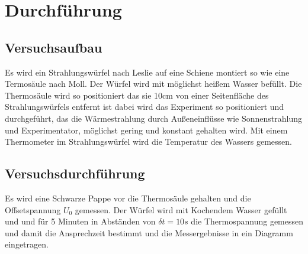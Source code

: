 \section{Durchführung}
\label{sec:Durchführung}
\subsection{Versuchsaufbau}
Es wird ein Strahlungswürfel nach Leslie auf eine Schiene montiert so wie eine
Termosäule nach Moll. Der Würfel wird mit möglichst heißem Wasser befüllt. Die
Thermosäule wird so positioniert das sie 10cm von einer Seitenfläche des
Strahlungswürfels entfernt ist dabei wird das Experiment so positioniert und
durchgeführt, das die Wärmestrahlung durch Außeneinflüsse wie Sonnenstrahlung
und Experimentator, möglichst gering und konstant gehalten  wird. Mit einem
Thermometer im Strahlungswürfel wird die Temperatur des Wassers gemessen.

\subsection{Versuchsdurchführung}
Es wird eine Schwarze Pappe vor die Thermosäule gehalten und die Offsetspannung
$U_0$ gemessen.
Der Würfel wird mit Kochendem Wasser gefüllt und und für 5 Minuten in Abständen
von $\delta t =10s$ die Thermospannung gemessen und damit die Ansprechzeit
bestimmt und die Messergebnisse in ein Diagramm eingetragen.
